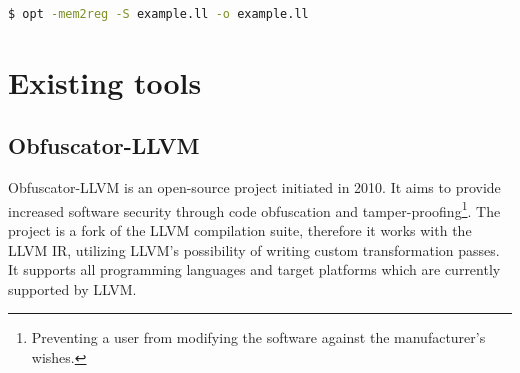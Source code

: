 \documentclass[
  digital, %
  table,   %
  twoside, %
  nolof,     %
  nolot,     %
]{fithesis3}
\theoremstyle{definition}
\begin{document}
\begin{lstlisting}[language=bash]
$ opt -mem2reg -S example.ll -o example.ll
\end{lstlisting}

\chapter{Existing tools}

\section{Obfuscator-LLVM}

Obfuscator-LLVM is an open-source project initiated in 2010. It aims to provide increased software security through code obfuscation and tamper-proofing\footnote{Preventing a user from modifying the software against the manufacturer's wishes.}. The project is a fork of the LLVM compilation suite, therefore it works with the LLVM IR, utilizing LLVM's possibility of writing custom transformation passes. It supports all programming languages and target platforms which are currently supported by LLVM. 
\end{document}
